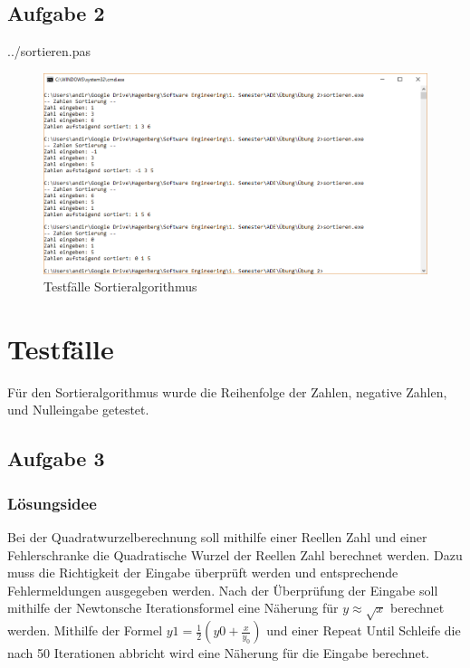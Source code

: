 \documentclass[a4papr,12pt]{article}
\begin{document}
\subsection*{Aufgabe 2}

 {../sortieren.pas}
\begin{figure}[H]
	\centering
	\includegraphics[scale=0.653]{./pictures/sortieren.png}
	\caption{Testfälle Sortieralgorithmus}
	\label{fig: Sortieralgorithmus}
\end{figure}

\section*{Testfälle}
Für den Sortieralgorithmus wurde die Reihenfolge der Zahlen, negative Zahlen, und Nulleingabe getestet.

\newpage

\subsection*{Aufgabe 3}
\subsubsection*{Lösungsidee}
Bei der Quadratwurzelberechnung soll mithilfe einer Reellen Zahl und einer Fehlerschranke die Quadratische Wurzel der Reellen Zahl berechnet werden. Dazu muss die Richtigkeit der Eingabe überprüft werden und entsprechende Fehlermeldungen ausgegeben werden. Nach der Überprüfung der Eingabe soll mithilfe der Newtonsche Iterationsformel eine Näherung für $y \approx \sqrt{x}$ berechnet werden. Mithilfe der Formel $ y1 = \frac{1}{2}(y0 + \frac{x}{y_{0}})$ und einer Repeat Until Schleife die nach 50 Iterationen abbricht wird eine Näherung für die Eingabe berechnet.
\end{document}
